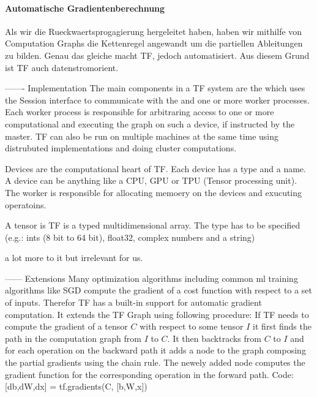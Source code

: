 \paragraph{Automatische Gradientenberechnung}
Als wir die Rueckwaertsprogagierung hergeleitet haben, haben wir mithilfe von
Computation Graphs die Kettenregel angewandt um die partiellen Ableitungen zu
bilden. Genau das gleiche macht TF, jedoch automatisiert. Aus diesem Grund ist
TF auch datenstromorient.



------- Implementation
The main components in a TF system are the  which uses the Session
interface to communicate with the  and one or more worker processes.
Each worker process is responsible for arbitraring access to one or more
computational  and executing the graph on such a device, if
instructed by the master.
TF can also be run on multiple machines at the same time using distrubuted
implementations and doing cluster computations.

Devices are the computational heart of TF. Each device has a type and a name. A
device can be anything like a CPU, GPU or TPU (Tensor processing unit). The
worker is responsible for allocating memoery on the devices and exucuting operatoins.

A tensor is TF is a typed multidimensional array. The type has to be specified
(e.g.: ints (8 bit to 64 bit), float32, complex numbers and a string)

a lot more to it but irrelevant for us.

------ Extensions
Many optimization algorithms including common ml training algorithms like SGD
compute the gradient of a cost function with respect to a set of inputs.
Therefor TF has a built-in support for automatic gradient computation.
It extends the TF Graph using following procedure:
If TF needs to compute the gradient of a tensor $C$ with respect to some tensor
$I$ it first finds the path in the computation graph from $I$ to $C$. It then
backtracks from $C$ to $I$ and for each operation on the backward path it adds a
node to the graph composing the partial gradients using the chain rule. The
newely added node computes the gradient function for the corresponding operation
in the forward path.
Code: [db,dW,dx] = tf.gradients(C, [b,W,x])


